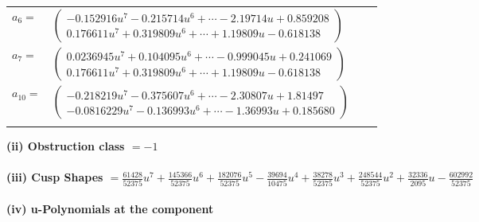 \documentclass[1p]{elsarticle_modified}
\theoremstyle{definition}
\begin{document}
\begin{tabular}{m{7pt} m{180pt} m{7pt} m{180pt} }
\flushright $a_{6}=$&$\begin{pmatrix}-0.152916 u^{7}-0.215714 u^{6}+\cdots-2.19714 u+0.859208\\0.176611 u^{7}+0.319809 u^{6}+\cdots+1.19809 u-0.618138\end{pmatrix}$ \\
\flushright $a_{7}=$&$\begin{pmatrix}0.0236945 u^{7}+0.104095 u^{6}+\cdots-0.999045 u+0.241069\\0.176611 u^{7}+0.319809 u^{6}+\cdots+1.19809 u-0.618138\end{pmatrix}$ \\
\flushright $a_{10}=$&$\begin{pmatrix}-0.218219 u^{7}-0.375607 u^{6}+\cdots-2.30807 u+1.81497\\-0.0816229 u^{7}-0.136993 u^{6}+\cdots-1.36993 u+0.185680\end{pmatrix}$\\&\end{tabular}
\flushleft \textbf{(ii) Obstruction class $= -1$}\\~\\
\flushleft \textbf{(iii) Cusp Shapes $= \frac{61428}{52375} u^7+\frac{145366}{52375} u^6+\frac{182076}{52375} u^5-\frac{39694}{10475} u^4+\frac{38278}{52375} u^3+\frac{248544}{52375} u^2+\frac{32336}{2095} u-\frac{602992}{52375}$}\\~\\
\newpage\renewcommand{\arraystretch}{1}
\flushleft \textbf{(iv) u-Polynomials at the component}\newline \\
\end{document}
